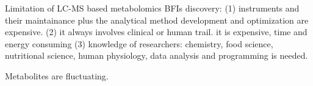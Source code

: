 Limitation of LC-MS based metabolomics BFIs discovery: 
(1) instruments and their maintainance plus the analytical method development and optimization are expensive.
(2) it always involves clinical or human trail. it is expensive, time and energy consuming
(3) knowledge of researchers: chemistry, food science, nutritional science, human physiology, data analysis and programming is needed.

Metabolites are fluctuating.
 
